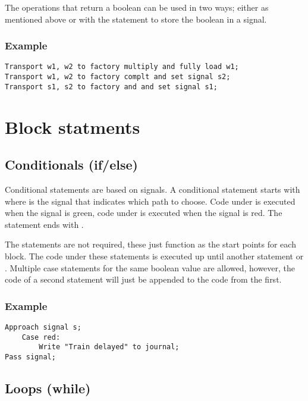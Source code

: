 The operations that return a boolean can be used in two ways; either as mentioned above or with the statement  to store the boolean in a signal.

\subsubsection*{Example}

\begin{lstlisting}
Transport w1, w2 to factory multiply and fully load w1;
Transport w1, w2 to factory complt and set signal s2;
Transport s1, s2 to factory and and set signal s1;
\end{lstlisting}

\section{Block statments}

\subsection{Conditionals (if/else)}

Conditional statements are based on signals. A conditional statement starts with  where  is the signal that indicates which path to choose. Code under  is executed when the signal is green, code under  is executed when the signal is red. The statement ends with .

The  statements are not required, these just function as the start points for each block. The code under these statements is executed up until another  statement or . Multiple case statements for the same boolean value are allowed, however, the code of a second statement will just be appended to the code from the first.

\subsubsection*{Example}

\begin{lstlisting}
Approach signal s;
	Case red:
		Write "Train delayed" to journal;
Pass signal;
\end{lstlisting}

\subsection{Loops (while)}

